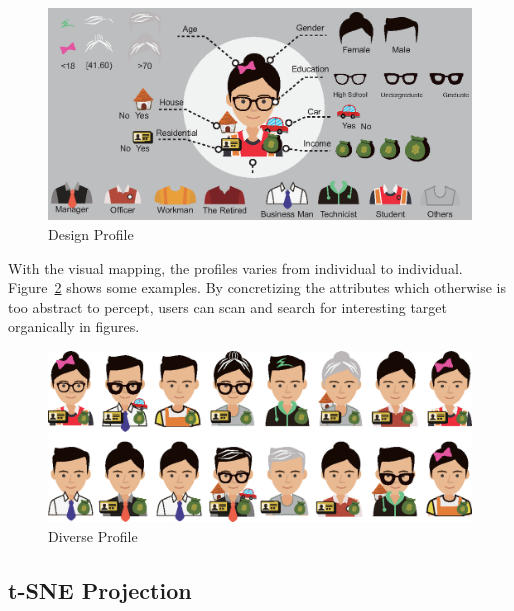 \begin{figure}[htb!]
 \centering %
 \includegraphics[width=\columnwidth]{pictures/design_profile}
 \caption{Design Profile}
 \label{fig:design_profile}
\end{figure}

With the visual mapping, the profiles varies from individual to individual. Figure~\ref{fig:div_profile} shows some examples. By concretizing the attributes which otherwise is too abstract to percept, users can scan and search for interesting target organically in figures.

\begin{figure}[htb!]
 \centering %
 \includegraphics[width=\columnwidth]{pictures/design_div}
 \caption{Diverse Profile}
 \label{fig:div_profile}
\end{figure}

\subsection{t-SNE Projection}

